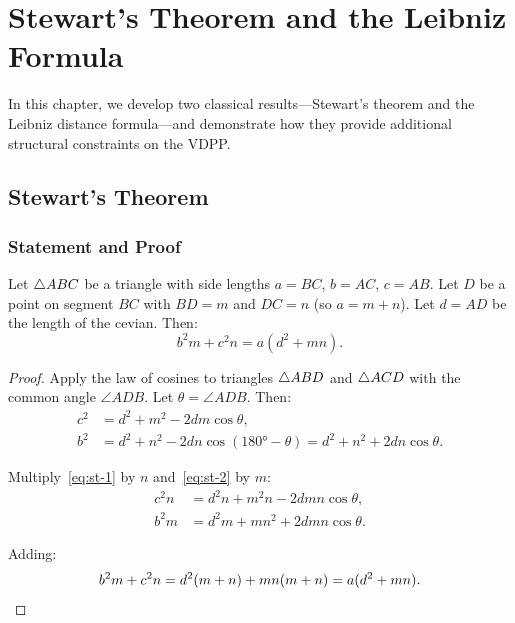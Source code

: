 
\chapter{Stewart's Theorem and the Leibniz Formula}
\label{ch:stewart-leibniz}

In this chapter, we develop two classical results---Stewart's theorem and the Leibniz distance formula---and demonstrate how they provide additional structural constraints on the VDPP.

\section{Stewart's Theorem}

\subsection{Statement and Proof}

\begin{theorem}
\label{thm:stewart}
Let $\triangle ABC$ be a triangle with side lengths $a = BC$, $b = AC$, $c = AB$. Let $D$ be a point on segment $BC$ with $BD = m$ and $DC = n$ (so $a = m + n$). Let $d = AD$ be the length of the cevian. Then:
\begin{equation}
\label{eq:stewart}
b^2 m + c^2 n = a(d^2 + mn).
\end{equation}
\end{theorem}

\begin{proof}
Apply the law of cosines to triangles $\triangle ABD$ and $\triangle ACD$ with the common angle $\angle ADB$. Let $\theta = \angle ADB$. Then:
\begin{align}
c^2 &= d^2 + m^2 - 2dm\cos\theta, \label{eq:st-1}\\
b^2 &= d^2 + n^2 - 2dn\cos(180° - \theta) = d^2 + n^2 + 2dn\cos\theta. \label{eq:st-2}
\end{align}

Multiply~\eqref{eq:st-1} by $n$ and~\eqref{eq:st-2} by $m$:
\begin{align}
c^2 n &= d^2 n + m^2 n - 2dmn\cos\theta, \\
b^2 m &= d^2 m + mn^2 + 2dmn\cos\theta.
\end{align}

Adding:
\begin{equation}
b^2 m + c^2 n = d^2(m + n) + mn(m + n) = a(d^2 + mn). \qedhere
\end{equation}
\end{proof}

